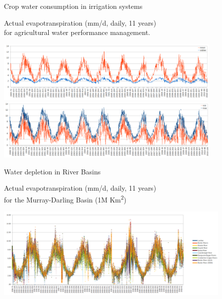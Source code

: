 \documentclass[xcolor=dvipsnames,beamer]{beamer} %
\begin{document}
\begin{frame}[fragile]{Crop water consumption in irrigation systems}

Actual evapotranspiration (mm/d, daily, 11 years)\\ 
for agricultural water performance management.\\

\begin{center}
 \includegraphics[width=11cm]{ciameanet}\\
 \includegraphics[width=11cm]{ciaminmaxet}
\end{center}
\end{frame}

\begin{frame}[fragile]{Water depletion in River Basins}

Actual evapotranspiration (mm/d, daily, 11 years)\\ 
for the Murray-Darling Basin (1M Km\textsuperscript{2})\\

\begin{center}
 \includegraphics[width=11.5cm]{mdbmeanet}
\end{center}
\end{frame}
\end{document}
